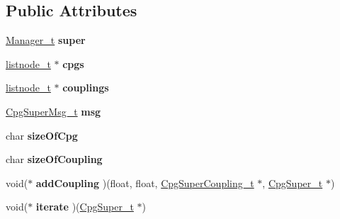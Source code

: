 \subsection*{Public Attributes}
\begin{DoxyCompactItemize}
\item 
\hypertarget{structCpgSuperManager__t_aa98fa7329760d6a2697c7850dcb437b4}{
\hyperlink{structManager__t}{Manager\_\-t} {\bfseries super}}
\label{structCpgSuperManager__t_aa98fa7329760d6a2697c7850dcb437b4}

\item 
\hypertarget{structCpgSuperManager__t_a2216074c95f55ab879f9d6fe509ddc42}{
\hyperlink{structlnode}{listnode\_\-t} $\ast$ {\bfseries cpgs}}
\label{structCpgSuperManager__t_a2216074c95f55ab879f9d6fe509ddc42}

\item 
\hypertarget{structCpgSuperManager__t_a6e5ce8269e8d908968944155357c499b}{
\hyperlink{structlnode}{listnode\_\-t} $\ast$ {\bfseries couplings}}
\label{structCpgSuperManager__t_a6e5ce8269e8d908968944155357c499b}

\item 
\hypertarget{structCpgSuperManager__t_a20c7bfd06eb26bfafdeb294f27226a97}{
\hyperlink{structCpgSuperMsg__t}{CpgSuperMsg\_\-t} {\bfseries msg}}
\label{structCpgSuperManager__t_a20c7bfd06eb26bfafdeb294f27226a97}

\item 
\hypertarget{structCpgSuperManager__t_a691cc5a79c091303903639bc77b63d6f}{
char {\bfseries sizeOfCpg}}
\label{structCpgSuperManager__t_a691cc5a79c091303903639bc77b63d6f}

\item 
\hypertarget{structCpgSuperManager__t_aed6114241077343b358c38b640ff3c2d}{
char {\bfseries sizeOfCoupling}}
\label{structCpgSuperManager__t_aed6114241077343b358c38b640ff3c2d}

\item 
\hypertarget{structCpgSuperManager__t_a51239dffd0463de57f70e01f98fd6270}{
void($\ast$ {\bfseries addCoupling} )(float, float, \hyperlink{structCpgSuperCoupling__t}{CpgSuperCoupling\_\-t} $\ast$, \hyperlink{structCpgSuper__t}{CpgSuper\_\-t} $\ast$)}
\label{structCpgSuperManager__t_a51239dffd0463de57f70e01f98fd6270}

\item 
\hypertarget{structCpgSuperManager__t_af5beb4b70dea5385c52741a6cd211809}{
void($\ast$ {\bfseries iterate} )(\hyperlink{structCpgSuper__t}{CpgSuper\_\-t} $\ast$)}
\label{structCpgSuperManager__t_af5beb4b70dea5385c52741a6cd211809}

\end{DoxyCompactItemize}


